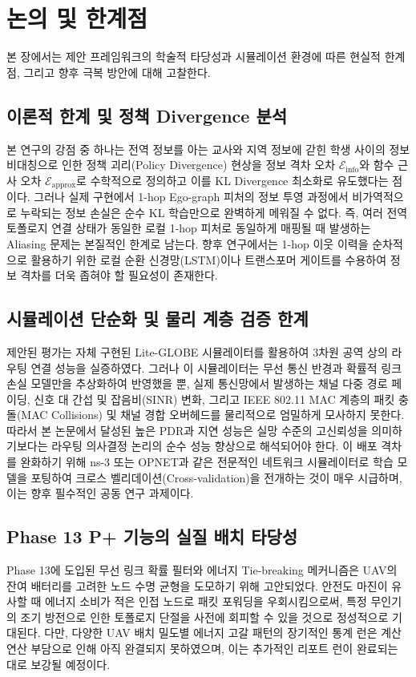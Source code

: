 \section{논의 및 한계점}
\label{sec:토의}

본 장에서는 제안 프레임워크의 학술적 타당성과 시뮬레이션 환경에 따른 현실적 한계점, 그리고 향후 극복 방안에 대해 고찰한다.

\subsection{이론적 한계 및 정책 Divergence 분석}
본 연구의 강점 중 하나는 전역 정보를 아는 교사와 지역 정보에 갇힌 학생 사이의 정보 비대칭으로 인한 정책 괴리(Policy Divergence) 현상을 정보 격차 오차 $\mathcal{E}_{\mathrm{info}}$와 함수 근사 오차 $\mathcal{E}_{\mathrm{approx}}$로 수학적으로 정의하고 이를 KL Divergence 최소화로 유도했다는 점이다. 그러나 실제 구현에서 1-hop Ego-graph 피처의 정보 투영 과정에서 비가역적으로 누락되는 정보 손실은 순수 KL 학습만으로 완벽하게 메워질 수 없다. 즉, 여러 전역 토폴로지 연결 상태가 동일한 로컬 1-hop 피처로 동일하게 매핑될 때 발생하는 Aliasing 문제는 본질적인 한계로 남는다. 향후 연구에서는 1-hop 이웃 이력을 순차적으로 활용하기 위한 로컬 순환 신경망(LSTM)이나 트랜스포머 게이트를 수용하여 정보 격차를 더욱 좁혀야 할 필요성이 존재한다.

\subsection{시뮬레이션 단순화 및 물리 계층 검증 한계}
제안된 평가는 자체 구현된 Lite-GLOBE 시뮬레이터를 활용하여 3차원 공역 상의 라우팅 연결 성능을 실증하였다. 그러나 이 시뮬레이터는 무선 통신 반경과 확률적 링크 손실 모델만을 추상화하여 반영했을 뿐, 실제 통신망에서 발생하는 채널 다중 경로 페이딩, 신호 대 간섭 및 잡음비(SINR) 변화, 그리고 IEEE 802.11 MAC 계층의 패킷 충돌(MAC Collisions) 및 채널 경합 오버헤드를 물리적으로 엄밀하게 모사하지 못한다. 
따라서 본 논문에서 달성된 높은 PDR과 지연 성능은 실망 수준의 고신뢰성을 의미하기보다는 라우팅 의사결정 논리의 순수 성능 향상으로 해석되어야 한다. 이 배포 격차를 완화하기 위해 ns-3 또는 OPNET과 같은 전문적인 네트워크 시뮬레이터로 학습 모델을 포팅하여 크로스 벨리데이션(Cross-validation)을 전개하는 것이 매우 시급하며, 이는 향후 필수적인 공동 연구 과제이다.

\subsection{Phase 13 P+ 기능의 실질 배치 타당성}
Phase 13에 도입된 무선 링크 확률 필터와 에너지 Tie-breaking 메커니즘은 UAV의 잔여 배터리를 고려한 노드 수명 균형을 도모하기 위해 고안되었다. 안전도 마진이 유사할 때 에너지 소비가 적은 인접 노드로 패킷 포워딩을 우회시킴으로써, 특정 무인기의 조기 방전으로 인한 토폴로지 단절을 사전에 회피할 수 있을 것으로 정성적으로 기대된다. 다만, 다양한 UAV 배치 밀도별 에너지 고갈 패턴의 장기적인 통계 런은 계산 연산 부담으로 인해 아직 완결되지 못하였으며, 이는 추가적인 리포트 런이 완료되는 대로 보강될 예정이다.
